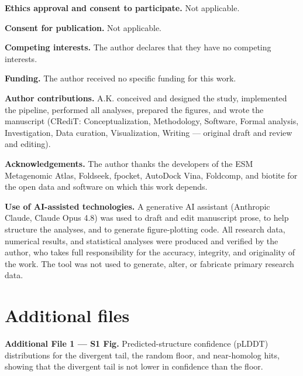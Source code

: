 \documentclass[10pt]{article}
\begin{document}
\noindent\textbf{Ethics approval and consent to participate.} Not applicable.

\noindent\textbf{Consent for publication.} Not applicable.

\noindent\textbf{Competing interests.} The author declares that they have no competing interests.

\noindent\textbf{Funding.} The author received no specific funding for this work.

\noindent\textbf{Author contributions.} A.K. conceived and designed the study, implemented the pipeline, performed all analyses, prepared the figures, and wrote the manuscript (CRediT: Conceptualization, Methodology, Software, Formal analysis, Investigation, Data curation, Visualization, Writing --- original draft and review and editing).

\noindent\textbf{Acknowledgements.} The author thanks the developers of the ESM Metagenomic Atlas, Foldseek, fpocket, AutoDock Vina, Foldcomp, and biotite for the open data and software on which this work depends.

\noindent\textbf{Use of AI-assisted technologies.} A generative AI assistant (Anthropic Claude, Claude Opus 4.8) was used to draft and edit manuscript prose, to help structure the analyses, and to generate figure-plotting code. All research data, numerical results, and statistical analyses were produced and verified by the author, who takes full responsibility for the accuracy, integrity, and originality of the work. The tool was not used to generate, alter, or fabricate primary research data.

\section*{Additional files}
\noindent\textbf{Additional File 1 --- S1 Fig.} Predicted-structure confidence (pLDDT) distributions for the divergent tail, the random floor, and near-homolog hits, showing that the divergent tail is not lower in confidence than the floor.
\end{document}
